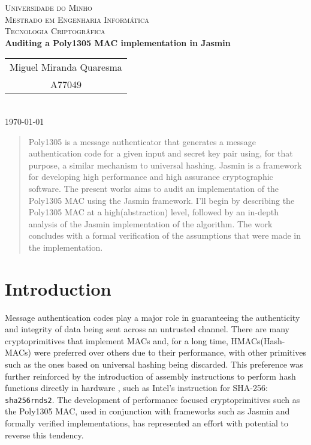 \documentclass{article}
\begin{document}
{    
    \center
    \textsc{\Large Universidade do Minho} \\ [0.5cm]
    \textsc{\Large Mestrado em Engenharia Informática} \\ [0.5cm]
    \textsc{\large Tecnologia Criptográfica} \\ [0.5cm]
    
    {\LARGE \bfseries Auditing a Poly1305 MAC implementation in Jasmin} \\ [0.5cm]

    \begin{tabular}{c}
        Miguel Miranda Quaresma \\
        A77049 \\
    \end{tabular} \\ [0.5cm]

    \today \\ [1cm]
}

\begin{abstract}
    Poly1305 is a message authenticator that generates a message authentication code for a given input and secret key pair using, for that purpose, a similar 
    mechanism to universal hashing. Jasmin is a framework for developing high performance and high assurance cryptographic software. The present works aims to 
    audit an implementation of the Poly1305 MAC using the Jasmin framework. I'll begin by describing the Poly1305 MAC at a high(abstraction) level, followed by 
    an in-depth analysis of the Jasmin implementation of the algorithm. The work concludes with a formal verification of the assumptions that were made in the 
    implementation.
\end{abstract}

\section{Introduction}
Message authentication codes play a major role in guaranteeing the authenticity and integrity of data being sent across an untrusted channel. There are many 
cryptoprimitives that implement MACs and, for a long time, HMACs(Hash-MACs) were preferred over others due to their performance, with other primitives such 
as the ones based on universal hashing being discarded. This preference was further reinforced by the introduction of assembly instructions to perform hash 
functions directly in hardware \cite{sha_extensions}, such as Intel's instruction for SHA-256: \texttt{sha256rnds2}. The development of performance focused 
cryptoprimitives such as the Poly1305 MAC, used in conjunction with frameworks such as Jasmin \cite{jasmin_paper} and formally verified implementations, 
has represented an effort with potential to reverse this tendency. 
\end{document}
